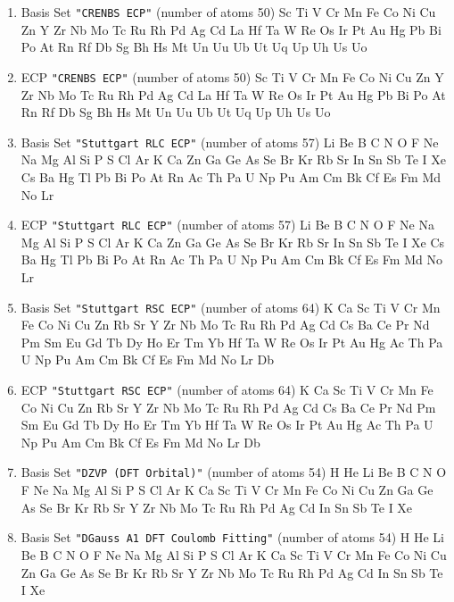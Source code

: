 \begin{enumerate}
\item Basis Set \verb#"CRENBS ECP"# (number of atoms 50)  \newline 
  Sc Ti V Cr Mn Fe Co Ni Cu Zn Y Zr Nb Mo Tc Ru Rh Pd Ag Cd La Hf Ta W Re
 Os Ir Pt Au Hg Pb Bi Po At Rn Rf Db Sg Bh Hs Mt Un Uu Ub Ut Uq Up Uh Us Uo



\item ECP \verb#"CRENBS ECP"# (number of atoms 50)  \newline 
  Sc Ti V Cr Mn Fe Co Ni Cu Zn Y Zr Nb Mo Tc Ru Rh Pd Ag Cd La Hf Ta W Re
 Os Ir Pt Au Hg Pb Bi Po At Rn Rf Db Sg Bh Hs Mt Un Uu Ub Ut Uq Up Uh Us Uo



\item Basis Set \verb#"Stuttgart RLC ECP"# (number of atoms 57)  \newline 
  Li Be B C N O F Ne Na Mg Al Si P S Cl Ar K Ca Zn Ga Ge As Se Br Kr
 Rb Sr In Sn Sb Te I Xe Cs Ba Hg Tl Pb Bi Po At Rn Ac Th Pa U Np Pu Am Cm
 Bk Cf Es Fm Md No Lr


\item ECP \verb#"Stuttgart RLC ECP"# (number of atoms 57)  \newline 
  Li Be B C N O F Ne Na Mg Al Si P S Cl Ar K Ca Zn Ga Ge As Se Br Kr
 Rb Sr In Sn Sb Te I Xe Cs Ba Hg Tl Pb Bi Po At Rn Ac Th Pa U Np Pu Am Cm
 Bk Cf Es Fm Md No Lr


\item Basis Set \verb#"Stuttgart RSC ECP"# (number of atoms 64)  \newline 
  K Ca Sc Ti V Cr Mn Fe Co Ni Cu Zn Rb Sr Y Zr Nb Mo Tc Ru Rh Pd Ag Cd Cs
 Ba Ce Pr Nd Pm Sm Eu Gd Tb Dy Ho Er Tm Yb Hf Ta W Re Os Ir Pt Au Hg Ac Th
 Pa U Np Pu Am Cm Bk Cf Es Fm Md No Lr Db


\item ECP \verb#"Stuttgart RSC ECP"# (number of atoms 64)  \newline 
  K Ca Sc Ti V Cr Mn Fe Co Ni Cu Zn Rb Sr Y Zr Nb Mo Tc Ru Rh Pd Ag Cd Cs
 Ba Ce Pr Nd Pm Sm Eu Gd Tb Dy Ho Er Tm Yb Hf Ta W Re Os Ir Pt Au Hg Ac Th
 Pa U Np Pu Am Cm Bk Cf Es Fm Md No Lr Db


\item Basis Set \verb#"DZVP (DFT Orbital)"# (number of atoms 54)  \newline 
  H He Li Be B C N O F Ne Na Mg Al Si P S Cl Ar K Ca Sc Ti V Cr Mn
 Fe Co Ni Cu Zn Ga Ge As Se Br Kr Rb Sr Y Zr Nb Mo Tc Ru Rh Pd Ag Cd In Sn
 Sb Te I Xe


\item Basis Set \verb#"DGauss A1 DFT Coulomb Fitting"# (number of atoms 54)  \newline 
  H He Li Be B C N O F Ne Na Mg Al Si P S Cl Ar K Ca Sc Ti V Cr Mn
 Fe Co Ni Cu Zn Ga Ge As Se Br Kr Rb Sr Y Zr Nb Mo Tc Ru Rh Pd Ag Cd In Sn
 Sb Te I Xe



\end{enumerate}
